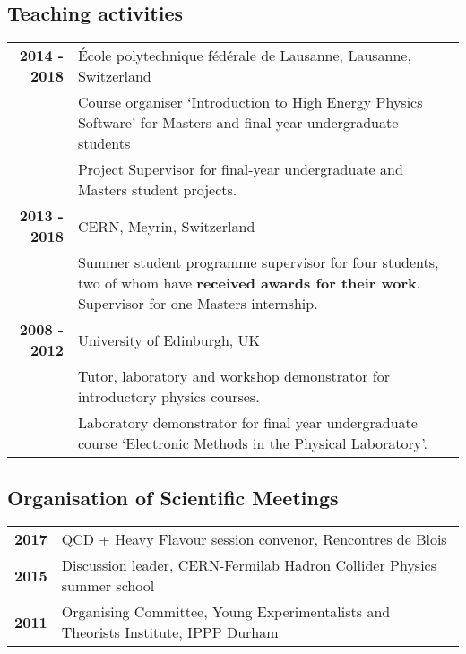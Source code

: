 \subsection*{Teaching activities}
\begin{flushleft}
\begin{tabular}{rp{13.5cm}}
\bf{2014 - 2018} &  \'Ecole polytechnique f\'ed\'erale de Lausanne, Lausanne, Switzerland \\
& Course organiser `Introduction to High Energy Physics Software' for Masters and final year undergraduate students  \\ 
& Project Supervisor for final-year undergraduate and Masters student projects.\\
\bf{2013 - 2018} & CERN, Meyrin, Switzerland \\
& Summer student programme supervisor for four students, two of whom have {\textbf{received awards for their work}}. Supervisor for one Masters internship. \\
\bf{2008 - 2012} & University of Edinburgh, UK \\ 
& Tutor, laboratory and workshop demonstrator for introductory physics courses. \\%
  & Laboratory demonstrator for final year undergraduate course `Electronic Methods in the Physical Laboratory'. 
\end{tabular}
\end{flushleft}
\subsection*{Organisation of Scientific Meetings}
\begin{flushleft}
\begin{tabular}{rl}
\bf{2017} & QCD + Heavy Flavour session convenor, Rencontres de Blois  \\
\bf{2015} & Discussion leader, CERN-Fermilab Hadron Collider Physics summer school \\
\bf{2011} & Organising Committee, Young Experimentalists and Theorists Institute, IPPP Durham  \\
\end{tabular}
\end{flushleft}

